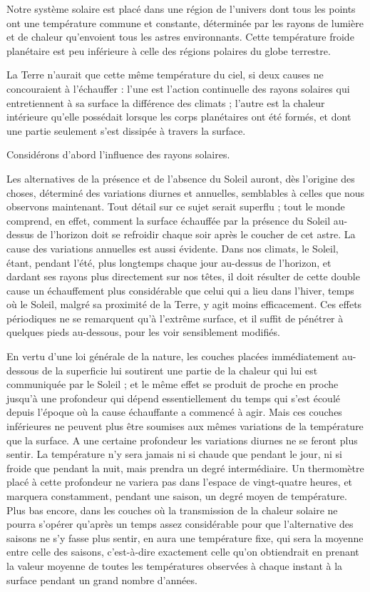 \documentclass[a4paper, 11pt, oneside]{article}
\begin{document}
Notre système solaire est placé dans une région de l'univers dont tous les points ont une température commune et constante, déterminée par les rayons de lumière et de chaleur qu'envoient tous les astres environnants. Cette température froide planétaire est peu inférieure à celle des régions polaires du globe terrestre.

La Terre n'aurait que cette même température du ciel, si deux causes ne concouraient à l'échauffer : l'une est l'action continuelle des rayons solaires qui entretiennent à sa surface la différence des climats ; l'autre est la chaleur intérieure qu'elle possédait lorsque les corps planétaires ont été formés, et dont une partie seulement s'est dissipée à travers la surface.

Considérons d'abord l'influence des rayons solaires.

Les alternatives de la présence et de l'absence du Soleil auront, dès l'origine des choses, déterminé des variations diurnes et annuelles, semblables à celles que nous observons maintenant. Tout détail sur ce sujet serait superflu ; tout le monde comprend, en effet, comment la surface échauffée par la présence du Soleil au-dessus de l'horizon doit se refroidir chaque soir après le coucher de cet astre. La cause des variations annuelles est aussi évidente. Dans nos climats, le Soleil, étant, pendant l'été, plus longtemps chaque jour au-dessus de l'horizon, et dardant ses rayons plus directement sur nos têtes, il doit résulter de cette double cause un échauffement plus considérable que celui qui a lieu dans l'hiver, temps où le Soleil, malgré sa proximité de la Terre, y agit moins efficacement. Ces effets périodiques ne se remarquent qu'à l'extrême surface, et il suffit de pénétrer à quelques pieds au-dessous, pour les voir sensiblement modifiés.

En vertu d'une loi générale de la nature, les couches placées immédiatement au-dessous de la superficie lui soutirent une partie de la chaleur qui lui est communiquée par le Soleil ; et le même effet se produit de proche en proche jusqu'à une profondeur qui dépend essentiellement du temps qui s'est écoulé depuis l'époque où la cause échauffante a commencé à agir. Mais ces couches inférieures ne peuvent plus être soumises aux mêmes variations de la température que la surface. A une certaine profondeur les variations diurnes ne se feront plus sentir. La température n'y sera jamais ni si chaude que pendant le jour, ni si froide que pendant la nuit, mais prendra un degré intermédiaire. Un thermomètre placé à cette profondeur ne variera pas dans l'espace de vingt-quatre heures, et marquera constamment, pendant une saison, un degré moyen de température. Plus bas encore, dans les couches où la transmission de la chaleur solaire ne pourra s'opérer qu'après un temps assez considérable pour que l'alternative des saisons ne s'y fasse plus sentir, en aura une température fixe, qui sera la moyenne entre celle des saisons, c'est-à-dire exactement celle qu'on obtiendrait en prenant la valeur moyenne de toutes les températures observées à chaque instant à la surface pendant un grand nombre d'années.
\end{document}
